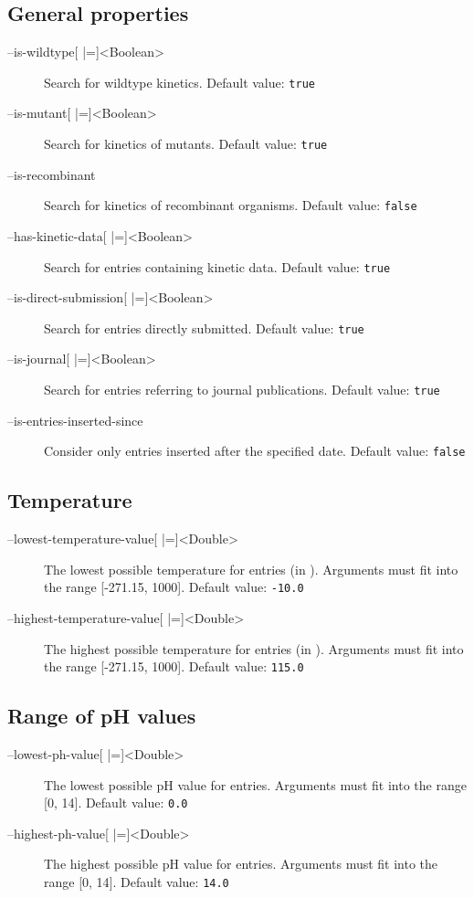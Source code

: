 \subsection{General properties}
\begin{description}
\item[--is-wildtype{[} |={]}<Boolean>]
  Search for wildtype kinetics.
  Default value: \texttt{true}

\item[--is-mutant{[} |={]}<Boolean>]
  Search for kinetics of mutants.
  Default value: \texttt{true}

\item[--is-recombinant]
  Search for kinetics of recombinant organisms.
  Default value: \texttt{false}

\item[--has-kinetic-data{[} |={]}<Boolean>]
  Search for entries containing kinetic data.
  Default value: \texttt{true}

\item[--is-direct-submission{[} |={]}<Boolean>]
  Search for entries directly submitted.
  Default value: \texttt{true}

\item[--is-journal{[} |={]}<Boolean>]
  Search for entries referring to journal publications.
  Default value: \texttt{true}

\item[--is-entries-inserted-since]
  Consider only entries inserted after the specified date.
  Default value: \texttt{false}
\end{description}

\subsection{Temperature}
\begin{description}
\item[--lowest-temperature-value{[} |={]}<Double>]
  The lowest possible temperature for entries (in \textcelsius).
  Arguments must fit into the range {[}-271.15, 1000{]}.
  Default value: \texttt{-10.0}

\item[--highest-temperature-value{[} |={]}<Double>]
  The highest possible temperature for entries (in \textcelsius).
  Arguments must fit into the range {[}-271.15, 1000{]}.
  Default value: \texttt{115.0}
\end{description}

\subsection{Range of pH values}
\begin{description}
\item[--lowest-ph-value{[} |={]}<Double>]
  The lowest possible pH value for entries.
  Arguments must fit into the range {[}0, 14{]}.
  Default value: \texttt{0.0}

\item[--highest-ph-value{[} |={]}<Double>]
  The highest possible pH value for entries.
  Arguments must fit into the range {[}0, 14{]}.
  Default value: \texttt{14.0}
\end{description}

